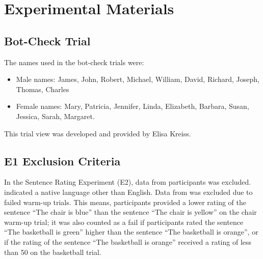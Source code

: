\section{Experimental Materials}
\subsection{Bot-Check Trial}
The names used in the bot-check trials were: 
\begin{itemize}
\item Male names: James, John, Robert, Michael, William, David, Richard, Joseph, Thomas, Charles 
\item Female names: Mary, Patricia, Jennifer, Linda, Elizabeth, Barbara, Susan, Jessica, Sarah, Margaret. 
\end{itemize}
This trial view was developed and provided by Elisa Kreiss. 
\subsection{E1 Exclusion Criteria}
In the Sentence Rating Experiment (E2), data from  participants was excluded.  indicated a native language other than English. Data from  was excluded due to failed warm-up trials. This means, participants provided a lower rating of the sentence “The chair is blue” than the sentence “The chair is yellow” on the chair warm-up trial; it was also counted as a fail if participants rated the sentence “The basketball is green” higher than the sentence “The basketball is orange”, or if the rating of the sentence “The basketball is orange” received a rating of less than 50 on the basketball trial.

